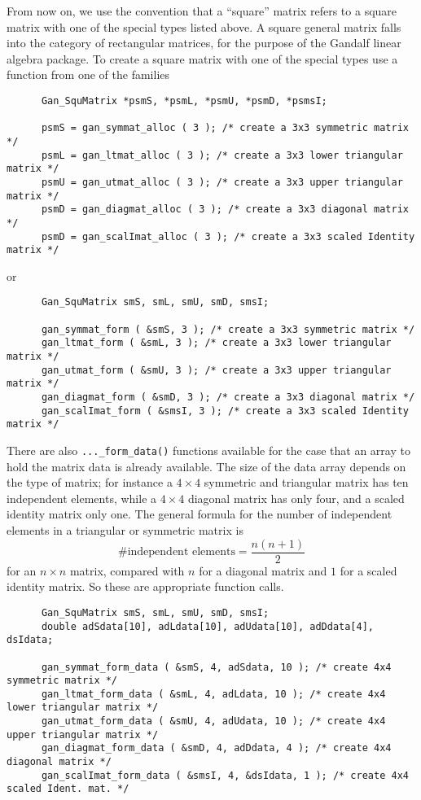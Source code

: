 From now on, we use the convention that a ``square'' matrix refers to a
square matrix with one of the special types listed above. A square general
matrix falls into the category of rectangular matrices, for the purpose of
the Gandalf linear algebra package.
To create a square matrix with one of the special types use a function
from one of the families
\begin{verbatim}
      Gan_SquMatrix *psmS, *psmL, *psmU, *psmD, *psmsI;

      psmS = gan_symmat_alloc ( 3 ); /* create a 3x3 symmetric matrix */
      psmL = gan_ltmat_alloc ( 3 ); /* create a 3x3 lower triangular matrix */
      psmU = gan_utmat_alloc ( 3 ); /* create a 3x3 upper triangular matrix */
      psmD = gan_diagmat_alloc ( 3 ); /* create a 3x3 diagonal matrix */
      psmD = gan_scalImat_alloc ( 3 ); /* create a 3x3 scaled Identity matrix */
\end{verbatim}
or
\begin{verbatim}
      Gan_SquMatrix smS, smL, smU, smD, smsI;

      gan_symmat_form ( &smS, 3 ); /* create a 3x3 symmetric matrix */
      gan_ltmat_form ( &smL, 3 ); /* create a 3x3 lower triangular matrix */
      gan_utmat_form ( &smU, 3 ); /* create a 3x3 upper triangular matrix */
      gan_diagmat_form ( &smD, 3 ); /* create a 3x3 diagonal matrix */
      gan_scalImat_form ( &smsI, 3 ); /* create a 3x3 scaled Identity matrix */
\end{verbatim}
There are also {\tt ...\_form\_data()} functions available for the case that
an array to hold the matrix data is already available. The size of the data
array depends on the type of matrix; for instance a $4\times 4$ symmetric
and triangular matrix has ten independent elements, while a $4\times 4$
diagonal matrix has only four, and a scaled identity matrix only one.
The general formula for the number of independent elements in a triangular
or symmetric matrix is
\begin{equation}
 \mbox{\# independent elements} = \frac{n(n+1)}{2} \label{symtri-els}
\end{equation}
for an $n\times n$ matrix, compared with $n$ for a diagonal matrix and $1$ for
a scaled identity matrix. So these are appropriate function calls.
\begin{verbatim}
      Gan_SquMatrix smS, smL, smU, smD, smsI;
      double adSdata[10], adLdata[10], adUdata[10], adDdata[4], dsIdata;

      gan_symmat_form_data ( &smS, 4, adSdata, 10 ); /* create 4x4 symmetric matrix */
      gan_ltmat_form_data ( &smL, 4, adLdata, 10 ); /* create 4x4 lower triangular matrix */
      gan_utmat_form_data ( &smU, 4, adUdata, 10 ); /* create 4x4 upper triangular matrix */
      gan_diagmat_form_data ( &smD, 4, adDdata, 4 ); /* create 4x4 diagonal matrix */
      gan_scalImat_form_data ( &smsI, 4, &dsIdata, 1 ); /* create 4x4 scaled Ident. mat. */
\end{verbatim}
